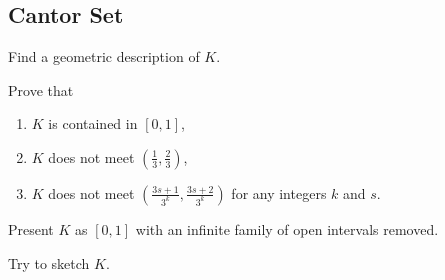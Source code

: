 \subsection{Cantor Set}

\begin{majorEx}
    Find a geometric description of $K$.

    Prove that
    \begin{enumerate}
        \item $K$ is contained in $[0,1]$,
        \item $K$ does not meet $(\frac{1}{3}, \frac{2}{3})$,
        \item $K$ does not meet $\left( \frac{3s+1}{3^k}, \frac{3s+2}{3^k}
            \right)$ for any integers $k$ and $s$.
    \end{enumerate}

    Present $K$ as $[0,1]$ with an infinite family of open intervals removed.

    Try to sketch $K$.
\end{majorEx}

